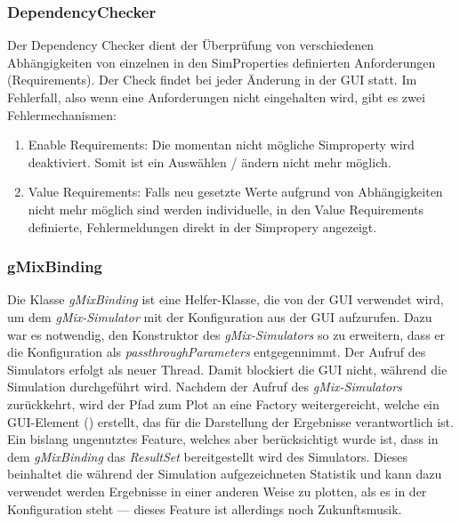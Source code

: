 \documentclass[a4paper, 11pt]{article} %
\begin{document}
\subsubsection{DependencyChecker}
\label{sssub:dependencychecker}
Der Dependency Checker dient der Überprüfung von verschiedenen Abhängigkeiten von einzelnen in den SimProperties definierten Anforderungen (Requirements).
Der Check findet bei jeder Änderung in der GUI statt. Im Fehlerfall, also wenn eine Anforderungen nicht eingehalten wird, gibt es zwei Fehlermechanismen:
\begin{enumerate}
	\item Enable Requirements: Die momentan nicht mögliche Simproperty wird deaktiviert. Somit ist ein Auswählen / ändern nicht mehr möglich.
	\item Value Requirements: Falls neu gesetzte Werte aufgrund von Abhängigkeiten nicht mehr möglich sind werden individuelle, in den Value Requirements definierte, Fehlermeldungen direkt in der Simpropery angezeigt.
\end{enumerate}


\subsubsection{gMixBinding} %
\label{ssub:gmixbinding}
Die Klasse \emph{gMixBinding} ist eine Helfer-Klasse, die von der GUI verwendet wird, um dem \emph{gMix-Simulator} mit der Konfiguration aus der GUI aufzurufen. Dazu war es notwendig, den Konstruktor des \emph{gMix-Simulators} so zu erweitern, dass er die Konfiguration als \emph{passthroughParameters} entgegennimmt. Der Aufruf des Simulators erfolgt als neuer Thread. Damit blockiert die GUI nicht, während die Simulation durchgeführt wird. Nachdem der Aufruf des \emph{gMix-Simulators} zurückkehrt, wird der Pfad zum Plot an eine Factory weitergereicht, welche ein GUI-Element (\emph{}) erstellt, das für die Darstellung der Ergebnisse verantwortlich ist.\\

Ein bislang ungenutztes Feature, welches aber berücksichtigt wurde ist, dass in dem \emph{gMixBinding} das \emph{ResultSet} bereitgestellt wird des Simulators. Dieses beinhaltet die während der Simulation aufgezeichneten Statistik und kann dazu verwendet werden Ergebnisse in einer anderen Weise zu plotten, als es in der Konfiguration steht --- dieses Feature ist allerdings noch Zukunftsmusik.\\
\end{document}
